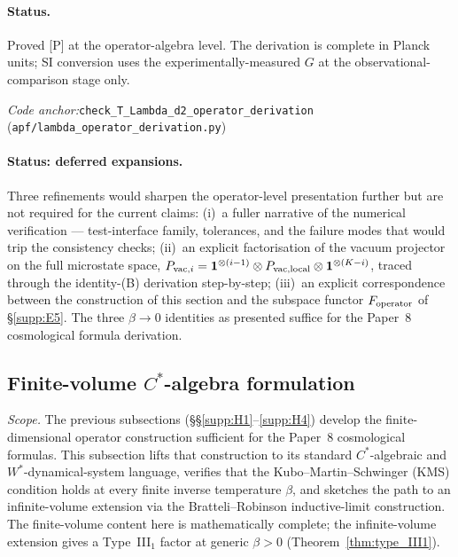 \documentclass[11pt]{article}
\theoremstyle{plain}
\theoremstyle{definition}
\theoremstyle{remark}
\newcommand{\coderef}[2]{\par\noindent\textit{Code anchor:}\quad\texttt{#1} (\texttt{#2})}
\begin{document}
\paragraph{Status.}  Proved [P] at the operator-algebra level.  The derivation is complete in Planck units; SI conversion uses the experimentally-measured $G$ at the observational-comparison stage only.

\coderef{check\_T\_Lambda\_d2\_operator\_derivation}{apf/lambda\_operator\_derivation.py}

\bigskip

\paragraph{Status: deferred expansions.}  Three refinements would sharpen the operator-level presentation further but are not required for the current claims:
(i)~a fuller narrative of the numerical verification --- test-interface family, tolerances, and the failure modes that would trip the consistency checks;
(ii)~an explicit factorisation of the vacuum projector on the full microstate space, $P_{{\rm vac},i} = \mathbf{1}^{\otimes (i-1)} \otimes P_{\rm vac,local} \otimes \mathbf{1}^{\otimes (K-i)}$, traced through the identity-(B) derivation step-by-step;
(iii)~an explicit correspondence between the construction of this section and the subspace functor $F_{\rm operator}$ of \S\ref{supp:E5}.
The three $\beta \to 0$ identities as presented suffice for the Paper~8 cosmological formula derivation.

\bigskip

\subsection{Finite-volume $C^*$-algebra formulation}\label{supp:H5}

\noindent\textit{Scope.}  The previous subsections (\S\S\ref{supp:H1}--\ref{supp:H4}) develop the finite-dimensional operator construction sufficient for the Paper~8 cosmological formulas.  This subsection lifts that construction to its standard $C^*$-algebraic and $W^*$-dynamical-system language, verifies that the Kubo--Martin--Schwinger (KMS) condition holds at every finite inverse temperature $\beta$, and sketches the path to an infinite-volume extension via the Bratteli--Robinson inductive-limit construction.  The finite-volume content here is mathematically complete; the infinite-volume extension gives a Type~III$_1$ factor at generic $\beta > 0$ (Theorem~\ref{thm:type_III1}).
\end{document}
